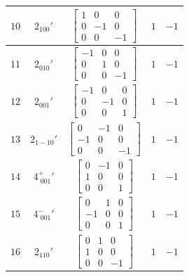 \documentclass[fleqn,8pt]{jsarticle}
\begin{document}
\begin{longtable}{ccccc}
$ 10 $ & $ 2{}_{100}{}' $ & $ \begin{bmatrix} 1 & 0 & 0 \\ 0 & -1 & 0 \\ 0 & 0 & -1 \end{bmatrix} $ & $ 1 $ & $ -1 $ \\ \hline
$ 11 $ & $ 2{}_{010}{}' $ & $ \begin{bmatrix} -1 & 0 & 0 \\ 0 & 1 & 0 \\ 0 & 0 & -1 \end{bmatrix} $ & $ 1 $ & $ -1 $ \\ \hline
$ 12 $ & $ 2{}_{001}{}' $ & $ \begin{bmatrix} -1 & 0 & 0 \\ 0 & -1 & 0 \\ 0 & 0 & 1 \end{bmatrix} $ & $ 1 $ & $ -1 $ \\ \hline
$ 13 $ & $ 2{}_{1-10}{}' $ & $ \begin{bmatrix} 0 & -1 & 0 \\ -1 & 0 & 0 \\ 0 & 0 & -1 \end{bmatrix} $ & $ 1 $ & $ -1 $ \\ \hline
$ 14 $ & $ 4^{+}_{\,\,001}{}' $ & $ \begin{bmatrix} 0 & -1 & 0 \\ 1 & 0 & 0 \\ 0 & 0 & 1 \end{bmatrix} $ & $ 1 $ & $ -1 $ \\ \hline
$ 15 $ & $ 4^{-}_{\,\,001}{}' $ & $ \begin{bmatrix} 0 & 1 & 0 \\ -1 & 0 & 0 \\ 0 & 0 & 1 \end{bmatrix} $ & $ 1 $ & $ -1 $ \\ \hline
$ 16 $ & $ 2{}_{110}{}' $ & $ \begin{bmatrix} 0 & 1 & 0 \\ 1 & 0 & 0 \\ 0 & 0 & -1 \end{bmatrix} $ & $ 1 $ & $ -1 $ \\
\end{longtable}
\end{document}
